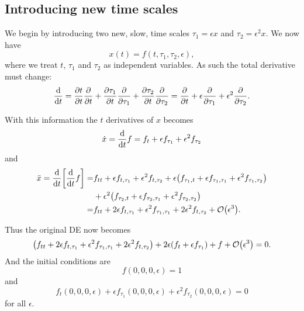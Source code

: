 \documentclass[11pt,letter, swedish, english
]{article}
\begin{document}
\subsection{Introducing new time scales}
We begin by introducing two new, slow, time scales $\tau_1=\epsilon x$
and $\tau_2=\epsilon^2 x$. We now have
\begin{equation}
x(t)=f(t, \tau_1, \tau_2, \epsilon),
\end{equation}
where we treat $t$, $\tau_1$ and $\tau_2$ as independent variables. 
As such the total derivative must change:
\begin{equation}
\dv{t}=\pdv{t}{t}\pdv{t}+\pdv{\tau_1}{t}\pdv{\tau_1}
+\pdv{\tau_2}{t}\pdv{\tau_2}
=\pdv{t}+\epsilon\pdv{\tau_1}+\epsilon^2\pdv{\tau_2}. 
\end{equation}

With this information the $t$ derivatives of $x$ becomes
\begin{equation}
\dot{x}=\dv{t}f
=f_t + \epsilon f_{\tau_1}+\epsilon^2 f_{\tau_2}
\end{equation}
and
\begin{equation}
\begin{aligned}
\ddot{x}=\dv{t}\qty[\dv{t}f]
=&f_{tt}+\epsilon f_{t,\tau_1}+\epsilon^2 f_{t,\tau_2}
+\epsilon\qty(
f_{\tau_1,t}+\epsilon f_{\tau_1,\tau_1}+\epsilon^2f_{\tau_1,\tau_2})
\\ 
&+\epsilon^2\qty(
f_{\tau_2,t}+\epsilon f_{\tau_2,\tau_1}+\epsilon^2f_{\tau_2,\tau_2})
\\
=&f_{tt} + 2\epsilon f_{t,\tau_1} 
+ \epsilon^2 f_{\tau_1,\tau_1} + 2\epsilon^2 f_{t,\tau_2}
+\order{\epsilon^3}.
\end{aligned}
\end{equation}

Thus the original DE now becomes
\begin{equation}\label{eq:2_DE_f}
\qty(f_{tt} + 2\epsilon f_{t,\tau_1} 
+ \epsilon^2 f_{\tau_1,\tau_1} + 2\epsilon^2 f_{t,\tau_2})
+2\epsilon\qty(f_t + \epsilon f_{\tau_1})
+f+\order{\epsilon^3}=0.
\end{equation}
And the initial conditions are
\begin{equation}\label{eq:2_init}
f(0, 0, 0, \epsilon)=1
\end{equation}
and
\begin{equation}\label{eq:2_init_d0}
f_t(0, 0, 0, \epsilon) + \epsilon f_{\tau_1}(0, 0, 0,
\epsilon)+\epsilon^2 f_{\tau_2}(0, 0, 0, \epsilon)
=0
\end{equation}
for all $\epsilon$. 
\end{document}

